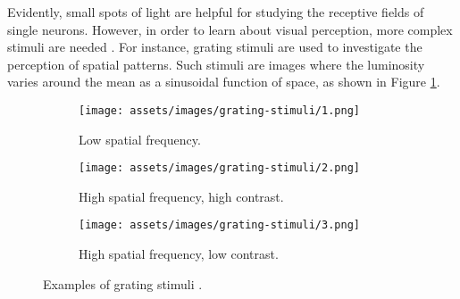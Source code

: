 Evidently, small spots of light are helpful for studying the receptive fields of single neurons. However, in order to learn about visual perception, more complex stimuli are needed \cite{KandelBook2003:26}. For instance, grating stimuli are used to investigate the perception of spatial patterns. Such stimuli are images where the luminosity varies around the mean as a sinusoidal function of space, as shown in Figure \ref{fig:grating-stimuli-examples}.
\begin{figure}[!htp]
    \centering
    \begin{subfigure}[t]{0.3\textwidth}
        \centering
        \texttt{[image: assets/images/grating-stimuli/1.png]}
        \caption{{Low spatial frequency.}}
    \end{subfigure}
    \hspace{0.03\textwidth}
    \begin{subfigure}[t]{0.3\textwidth}
        \centering
        \texttt{[image: assets/images/grating-stimuli/2.png]}
        \caption{High spatial frequency, high contrast.}
    \end{subfigure}
    \hspace{0.03\textwidth}
    \begin{subfigure}[t]{0.3\textwidth}
        \centering
        \texttt{[image: assets/images/grating-stimuli/3.png]}
        \caption{High spatial frequency, low contrast.}
    \end{subfigure}
    \caption[Examples of grating stimuli]{Examples of grating stimuli \cite{KandelBook2003:26}.}
    \label{fig:grating-stimuli-examples}
\end{figure}
